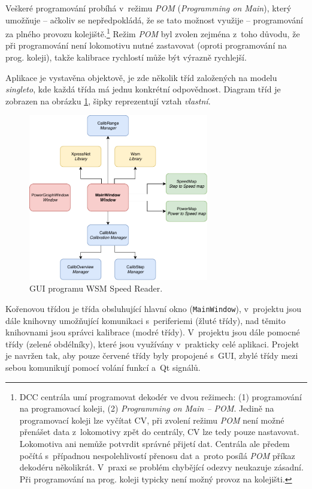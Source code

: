 Veškeré programování probíhá v~režimu \textit{POM} (\textit{Programming on
Main}), který umožňuje -- ačkoliv se nepředpokládá, že se tato možnost využije --
programování za plného provozu kolejiště.\footnote{DCC centrála umí programovat
dekodér ve dvou režimech: (1) programování na programovací koleji, (2)
\textit{Programming on Main -- POM}. Jedině na programovací koleji lze vyčítat
CV, při zvolení režimu \textit{POM} není možné přenášet data z~lokomotivy zpět
do centrály, CV lze tedy pouze nastavovat. Lokomotiva ani nemůže potvrdit
správné přijetí dat. Centrála ale předem počítá s~případnou nespolehlivostí
přenosu dat a~proto posílá \textit{POM} příkaz dekodéru několikrát. V~praxi se
problém chybějící odezvy neukazuje zásadní. Při programování na prog. koleji
typicky není možný provoz na kolejišti.} Režim \textit{POM} byl zvolen zejména
z~toho důvodu, že při programování není lokomotivu nutné zastavovat (oproti
programování na prog. koleji), takže kalibrace rychlostí může být výrazně
rychlejší.

Aplikace je vystavěna objektově, je zde několik tříd založených na modelu
\textit{singleto}, kde každá třída má jednu konkrétní odpovědnost. Diagram
tříd je zobrazen na obrázku \ref{fig:ac-classes}, šipky reprezentují vztah
\textit{vlastní}.

\begin{figure}[h]
\includegraphics[width=0.7\textwidth]{data/ac_classes.pdf}
\caption{GUI programu WSM Speed Reader.}
\label{fig:ac-classes}
\end{figure}

Kořenovou třídou je třída obsluhující hlavní okno (\texttt{MainWindow}),
v~projektu jsou dále knihovny umožňující komunikaci s~periferiemi (žluté třídy),
nad těmito knihovnami jsou správci kalibrace (modré třídy). V~projektu jsou
dále pomocné třídy (zelené obdélníky), které jsou využívány v~prakticky celé
aplikaci. Projekt je navržen tak, aby pouze červené třídy byly propojené
s~GUI, zbylé třídy mezi sebou komunikují pomocí volání funkcí a~Qt signálů.

